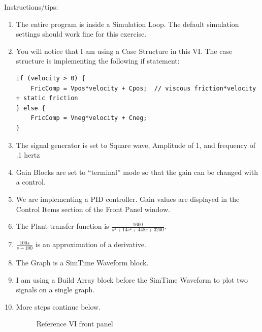 \documentclass[11pt]{article}
\begin{document}
Instructions/tips:
%
\begin{enumerate}
    \item The entire program is inside a Simulation Loop. The default simulation settings should work fine for this exercise.
    \item You will notice that I am using a Case Structure in this VI. The case structure is implementing the following if statement:
\begin{verbatim}
if (velocity > 0) {
    FricComp = Vpos*velocity + Cpos;  // viscous friction*velocity + static friction
} else {
    FricComp = Vneg*velocity + Cneg;
}
\end{verbatim}
    \item The signal generator is set to Square wave, Amplitude of 1, and frequency of .1 hertz
    \item Gain Blocks are set to “terminal” mode so that the gain can be changed with a control.
    \item We are implementing a PID controller. Gain values are displayed in the Control Items section of the Front Panel window.
    \item The Plant transfer function is $\frac{1600}{s^3 + 14s^2 + 448s + 3200}$.
    \item $\frac{100s}{s + 100}$ is an approximation of a derivative.
    \item The Graph is a SimTime Waveform block.
    \item I am using a Build Array block before the SimTime Waveform to plot two signals on a single graph.
    \item More steps continue below.
        \begin{figure}[H]
            \centering
            \caption{Reference VI front panel}
        \end{figure}
        \begin{figure}[H]
            \centering
\end{figure}
\end{enumerate}
\end{document}

